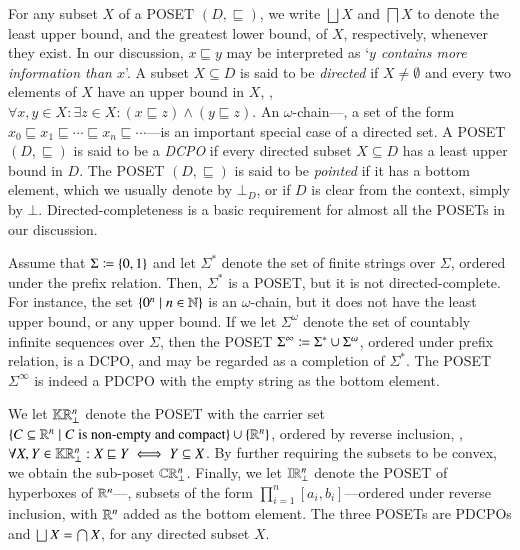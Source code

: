 \documentclass[11pt,times]{article}
\begin{document}
For any subset $X$ of a \acf{POSET} $(D, \sqsubseteq)$, we write
$\bigsqcup X$ and $\bigsqcap X$ to denote the least upper bound, and
the greatest lower bound, of $X$, respectively, whenever they
exist. In our discussion, $x \sqsubseteq y$ may be interpreted as
`\emph{$y$ contains more information than $x$}'.  A subset
$X \subseteq D$ is said to be \emph{directed} if $X\neq \emptyset$ and
every two elements of $X$ have an upper bound in $X$, {\ie},
$\forall x, y \in X: \exists z \in X: (x \sqsubseteq z) \wedge (y
\sqsubseteq z)$. An $\omega$-chain---{\ie}, a set of the form
$x_0 \sqsubseteq x_1 \sqsubseteq \cdots \sqsubseteq x_n \sqsubseteq
\cdots$---is an important special case of a directed set. A \ac{POSET}
$(D, \sqsubseteq)$ is said to be a \emph{\ac{DCPO}} if every directed
subset $X \subseteq D$ has a least upper bound in $D$. The \ac{POSET}
$(D, \sqsubseteq)$ is said to be \emph{pointed} if it has a bottom
element, which we usually denote by $\bot_D$, or if $D$ is clear from
the context, simply by $\bot$. Directed-completeness is a basic
requirement for almost all the \acp{POSET} in our discussion.


\begin{example}
  \label{example:sigma_infinity}
  Assume that $\Sigma \defeq \set{0,1}$ and let $\Sigma^*$ denote the
  set of finite strings over $\Sigma$, ordered under the prefix
  relation. Then, $\Sigma^*$ is a \ac{POSET}, but it is not
  directed-complete. For instance, the set
  $\setbarNormal{0^n}{ n \in \N}$ is an $\omega$-chain, but it does
  not have the least upper bound, or any upper bound. If we let
  $\Sigma^\omega$ denote the set of countably infinite sequences over
  $\Sigma$, then the \ac{POSET}
  $\Sigma^\infty \defeq \Sigma^* \cup \Sigma^\omega$, ordered under
  prefix relation, is a \ac{DCPO}, and may be regarded as a completion
  of $\Sigma^*$. The \ac{POSET} $\Sigma^\infty$ is indeed a \ac{PDCPO}
  with the empty string as the bottom element.
\end{example}

We let $\kCPPO{\R^n\lift}$ denote the \ac{POSET} with the carrier set
$\setbarNormal{C \subseteq \R^n}{C \text{ is non-empty and compact}}
\cup \set{\R^n}$, ordered by reverse inclusion, {\ie},
$\forall X, Y \in \kCPPO{\R^n\lift}: X \sqsubseteq Y \iff Y \subseteq
X$. By further requiring the subsets to be convex, we obtain the
sub-poset $\cCPPO{\R^n\lift}$. Finally, we let $\intvaldom[\R^n\lift]$
denote the \ac{POSET} of hyperboxes of $\R^n$---{\ie}, subsets of the
form $\prod_{i=1}^n [a_i,b_i]$---ordered under reverse inclusion, with
$\R^n$ added as the bottom element. The three \acp{POSET} are \acp{PDCPO}
and $\lub X = \bigcap X$, for any directed subset $X$. 
\end{document}
